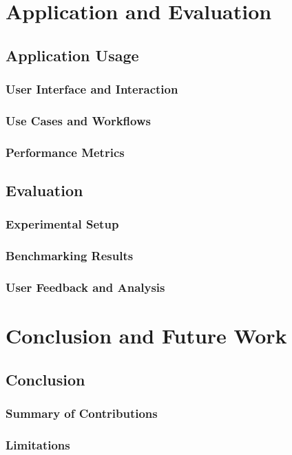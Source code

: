 \documentclass[11pt]{report}
\begin{document}
\part{Application and Evaluation}

\chapter{Application Usage}
\section{User Interface and Interaction}
\section{Use Cases and Workflows}
\section{Performance Metrics}

\chapter{Evaluation}
\section{Experimental Setup}
\section{Benchmarking Results}
\section{User Feedback and Analysis}

\part{Conclusion and Future Work}

\chapter{Conclusion}
\section{Summary of Contributions}
\section{Limitations}
\end{document}

